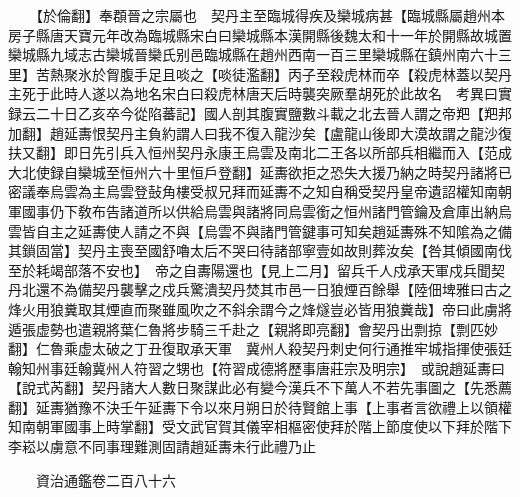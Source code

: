 　　【於倫翻】奉頵晉之宗屬也　契丹主至臨城得疾及欒城病甚【臨城縣屬趙州本房子縣唐天寶元年改為臨城縣宋白曰欒城縣本漢開縣後魏太和十一年於開縣故城置欒城縣九域志古欒城晉欒氏别邑臨城縣在趙州西南一百三里欒城縣在鎮州南六十三里】苦熱聚氷於胷腹手足且啖之【啖徒濫翻】丙子至殺虎林而卒【殺虎林蓋以契丹主死于此時人遂以為地名宋白曰殺虎林唐天后時襲突厥羣胡死於此故名　考異曰實録云二十日乙亥卒今從陷蕃記】國人剖其腹實鹽數斗載之北去晉人謂之帝羓【羓邦加翻】趙延夀恨契丹主負約謂人曰我不復入龍沙矣【盧龍山後即大漠故謂之龍沙復扶又翻】即日先引兵入恒州契丹永康王烏雲及南北二王各以所部兵相繼而入【范成大北使録自欒城至恒州六十里恒戶登翻】延夀欲拒之恐失大援乃納之時契丹諸將已密議奉烏雲為主烏雲登鼔角樓受叔兄拜而延夀不之知自稱受契丹皇帝遺詔權知南朝軍國事仍下敎布告諸道所以供給烏雲與諸將同烏雲銜之恒州諸門管鑰及倉庫出納烏雲皆自主之延夀使人請之不與【烏雲不與諸門管鍵事可知矣趙延夀殊不知隂為之備其鎖固當】契丹主喪至國舒嚕太后不哭曰待諸部寧壹如故則葬汝矣【咎其傾國南伐至於耗竭部落不安也】　帝之自夀陽還也【見上二月】留兵千人戍承天軍戍兵聞契丹北還不為備契丹襲擊之戍兵驚潰契丹焚其市邑一日狼煙百餘舉【陸佃埤雅曰古之烽火用狼糞取其煙直而聚雖風吹之不斜余謂今之烽燧豈必皆用狼糞哉】帝曰此虜將遁張虚勢也遣親將葉仁魯將步騎三千赴之【親將即亮翻】會契丹出剽掠【剽匹妙翻】仁魯乘虚太破之丁丑復取承天軍　冀州人殺契丹刺史何行通推牢城指揮使張廷翰知州事廷翰冀州人符習之甥也【符習成德將歷事唐莊宗及明宗】　或說趙延夀曰【說式芮翻】契丹諸大人數日聚謀此必有變今漢兵不下萬人不若先事圖之【先悉薦翻】延夀猶豫不決壬午延夀下令以來月朔日於待賢館上事【上事者言欲禮上以領權知南朝軍國事上時掌翻】受文武官賀其儀宰相樞密使拜於階上節度使以下拜於階下李崧以虜意不同事理難測固請趙延夀未行此禮乃止

　　資治通鑑卷二百八十六  
    


 


 



 

 
  







 


　　
　　
　
　
　


　　

　















